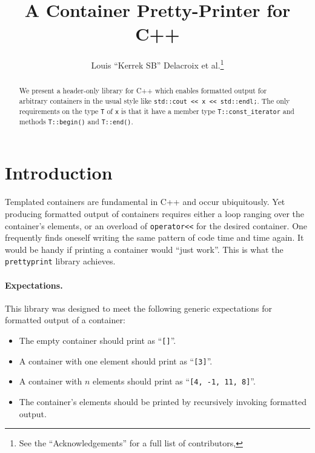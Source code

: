 \documentclass[a4paper,11pt]{article}
\title{A Container Pretty-Printer for C++}
\author{Louis ``Kerrek SB'' Delacroix et al.\thanks{See the ``Acknowledgements'' for a full list of contributors,}}
\date{}
\begin{document}
\maketitle

\begin{abstract}\noindent
We present a header-only library for C++ which enables formatted
output for arbitrary containers in the usual style like \texttt{std::cout
<< x << std::endl;}. The only requirements on the type \texttt{T} of
\texttt{x} is that it have a member type \texttt{T::const\_iterator} and
methods \texttt{T::begin()} and \texttt{T::end()}.
\end{abstract}

\section*{Introduction}

Templated containers are fundamental in C++ and occur ubiquitously. Yet
producing formatted output of containers requires either a loop ranging
over the container's elements, or an overload of \texttt{operator<<} for
the desired container. One frequently finds oneself writing the same
pattern of code time and time again. It would be handy if printing a
container would ``just work''. This is what the \texttt{prettyprint}
library achieves.

\paragraph{Expectations.} This library was designed to meet the following
generic expectations for formatted output of a container:

\begin{itemize}
\item The empty container should print as ``\texttt{[]}''.
\item A container with one element should print as ``\texttt{[3]}''.
\item A container with $n$ elements should print as ``\texttt{[4, -1, 11, 8]}''.
\item The container's elements should be printed by recursively invoking formatted output.
\end{itemize}
\end{document}

